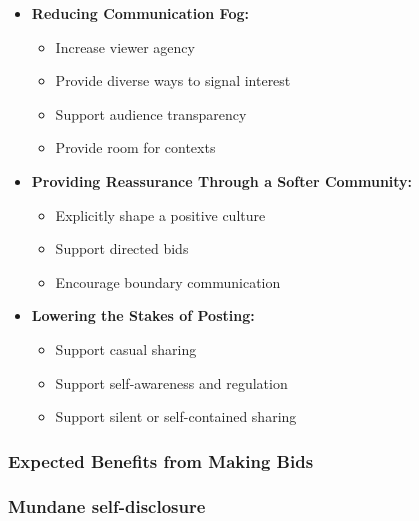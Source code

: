 \begin{itemize}
    \item \textbf{Reducing Communication Fog:}
    \begin{itemize}
        \item Increase viewer agency
        \item Provide diverse ways to signal interest
        \item Support audience transparency
        \item Provide room for contexts
    \end{itemize}
    \item \textbf{Providing Reassurance Through a Softer Community:}
    \begin{itemize}
        \item Explicitly shape a positive culture
        \item Support directed bids
        \item Encourage boundary communication
    \end{itemize}
    \item \textbf{Lowering the Stakes of Posting:}
    \begin{itemize}
        \item Support casual sharing
        \item Support self-awareness and regulation
        \item Support silent or self-contained sharing
    \end{itemize}
\end{itemize}

\subsubsection*{Expected Benefits from Making Bids}
\subsubsection*{Mundane self-disclosure}

\vspace{7mm}